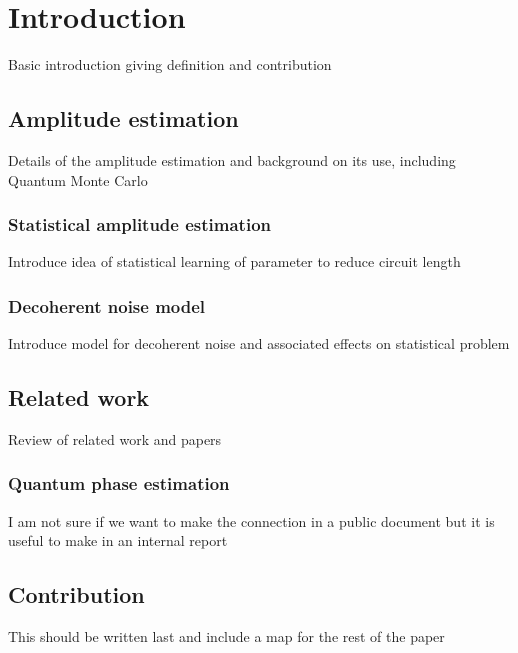 
\section{Introduction}
Basic introduction giving definition and contribution

\subsection{Amplitude estimation}
Details of the amplitude estimation and background on its use, including Quantum Monte Carlo

\subsubsection{Statistical amplitude estimation}
Introduce idea of statistical learning of parameter to reduce circuit length

\subsubsection{Decoherent noise model}
Introduce model for decoherent noise and associated effects on statistical problem

\subsection{Related work}
Review of related work and papers

\subsubsection{Quantum phase estimation}
I am not sure if we want to make the connection in a public document but it is useful to make in an internal report

\subsection{Contribution}
This should be written last and include a map for the rest of the paper
